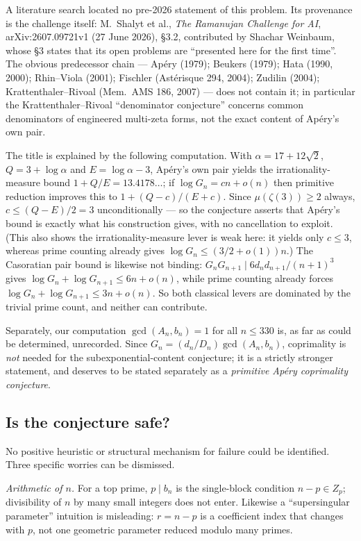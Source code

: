 A literature search located no pre-2026 statement of this problem.  Its provenance is the
challenge itself: M.~Shalyt et al., \emph{The Ramanujan Challenge for AI},
arXiv:2607.09721v1 (27 June 2026), \S3.2, contributed by Shachar Weinbaum, whose \S3 states
that its open problems are ``presented here for the first time''.  The obvious predecessor
chain — Ap\'ery (1979); Beukers (1979); Hata (1990, 2000); Rhin--Viola (2001); Fischler
(Ast\'erisque 294, 2004); Zudilin (2004); Krattenthaler--Rivoal (Mem.\ AMS 186, 2007) — does not
contain it; in particular the Krattenthaler--Rivoal ``denominator conjecture'' concerns common
denominators of engineered multi-zeta forms, not the exact content of Ap\'ery's own pair.

The title is explained by the following computation.  With $\alpha=17+12\sqrt2$,
$Q=3+\log\alpha$ and $E=\log\alpha-3$, Ap\'ery's own pair yields the irrationality-measure bound
$1+Q/E=13.4178\ldots$; if $\log G_n=cn+o(n)$ then primitive reduction improves this to
$1+(Q-c)/(E+c)$.  Since $\mu(\zeta(3))\ge2$ always, $c\le(Q-E)/2=3$ unconditionally — so the
conjecture asserts that Ap\'ery's bound is exactly what his construction gives, with no
cancellation to exploit.  (This also shows the irrationality-measure lever is weak here: it
yields only $c\le3$, whereas prime counting already gives $\log G_n\le(3/2+o(1))n$.)  The
Casoratian pair bound is likewise not binding: $G_nG_{n+1}\mid 6d_nd_{n+1}/(n+1)^3$ gives
$\log G_n+\log G_{n+1}\le6n+o(n)$, while prime counting already forces
$\log G_n+\log G_{n+1}\le3n+o(n)$.  So both classical levers are dominated by the trivial prime
count, and neither can contribute.

Separately, our computation $\gcd(A_n,b_n)=1$ for all $n\le330$ is, as far as could be
determined, unrecorded.  Since
$G_n=(d_n/D_n)\gcd(A_n,b_n)$, coprimality is \emph{not} needed for the subexponential-content
conjecture; it is a strictly stronger statement, and deserves to be stated separately as a
\emph{primitive Ap\'ery coprimality conjecture}.

\subsection{Is the conjecture safe?}

No positive heuristic or structural mechanism for failure could be identified.  Three specific
worries can be dismissed.

\emph{Arithmetic of $n$.}  For a top prime, $p\mid b_n$ is the single-block condition
$n-p\in Z_p$; divisibility of $n$ by many small integers does not enter.  Likewise a
``supersingular parameter'' intuition is misleading: $r=n-p$ is a coefficient index that changes
with $p$, not one geometric parameter reduced modulo many primes.


